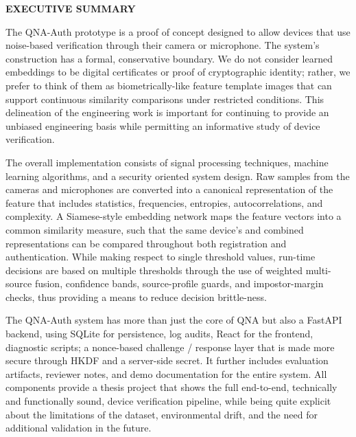 \begin{center}
	\Large{\textbf{EXECUTIVE SUMMARY}}
\end{center}
\vspace{1em}
\normalsize
\justifying
\hspace{1cm}The QNA-Auth prototype is a proof of concept designed to allow devices that use noise-based verification through their camera or microphone. The system's construction has a formal, conservative boundary. We do not consider learned embeddings to be digital certificates or proof of cryptographic identity; rather, we prefer to think of them as biometrically-like feature template images that can support continuous similarity comparisons under restricted conditions. This delineation of the engineering work is important for continuing to provide an unbiased engineering basis while permitting an informative study of device verification.


\hspace{1cm}The overall implementation consists of signal processing techniques, machine learning algorithms, and a security oriented system design. Raw samples from the cameras and microphones are converted into a canonical representation of the feature that includes statistics, frequencies, entropies, autocorrelations, and complexity. A Siamese-style embedding network maps the feature vectors into a common similarity measure, such that the same device's and combined representations can be compared throughout both registration and authentication. While making respect to single threshold values, run-time decisions are based on multiple thresholds through the use of weighted multi-source fusion, confidence bands, source-profile guards, and impostor-margin checks, thus providing a means to reduce decision brittle-ness.

\hspace{1cm}The QNA-Auth system has more than just the core of QNA but also a FastAPI backend, using SQLite for persistence, log audits, React for the frontend, diagnostic scripts; a nonce-based challenge / response layer that is made more secure through HKDF and a server-side secret. It further includes evaluation artifacts, reviewer notes, and demo documentation for the entire system. All components provide a thesis project that shows the full end-to-end, technically and functionally sound, device verification pipeline, while being quite explicit about the limitations of the dataset, environmental drift, and the need for additional validation in the future.
